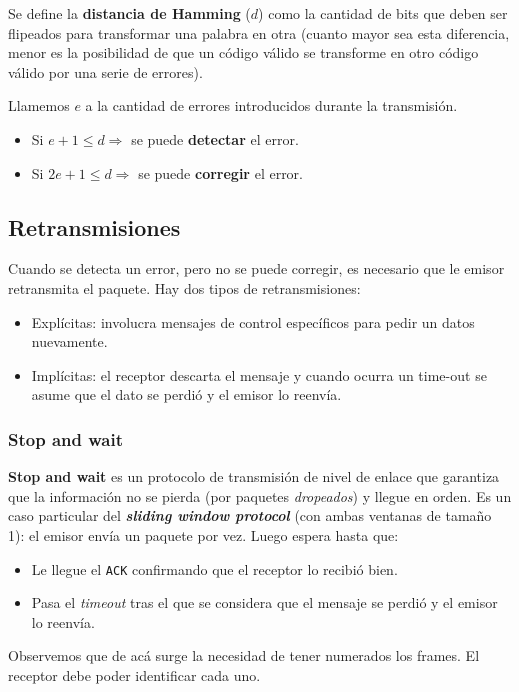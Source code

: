 \documentclass[]{article}
\begin{document}
Se define la \textbf{distancia de Hamming} ($d$) como la cantidad de bits que deben ser flipeados para transformar una palabra en otra (cuanto mayor sea esta diferencia, menor es la posibilidad de que un código válido se transforme en otro código válido por una serie de errores).

Llamemos $e$ a la cantidad de errores introducidos durante la transmisión.
\begin{itemize}
    \item Si $e + 1 \leq d \Rightarrow$ se puede \textbf{detectar} el error.
    \item Si $2e + 1 \leq d \Rightarrow$ se puede \textbf{corregir} el error.
\end{itemize}

\subsection{Retransmisiones}
Cuando se detecta un error, pero no se puede corregir, es necesario que le emisor retransmita el paquete. Hay dos tipos de retransmisiones:
\begin{itemize}
    \item Explícitas: involucra mensajes de control específicos para pedir un datos nuevamente.
    \item Implícitas: el receptor descarta el mensaje y cuando ocurra un time-out se asume que el dato se perdió y el emisor lo reenvía.
\end{itemize}

\subsubsection{Stop and wait}
\textbf{Stop and wait} es un protocolo de transmisión de nivel de enlace que garantiza que la información no se pierda (por paquetes \emph{dropeados}) y llegue en orden. Es un caso particular del \emph{\textbf{sliding window protocol}} (con ambas ventanas de tamaño 1): el emisor envía un paquete por vez. Luego espera hasta que:
\begin{itemize}
    \item Le llegue el \texttt{ACK} confirmando que el receptor lo recibió bien.
    \item Pasa el \emph{timeout} tras el que se considera que el mensaje se perdió y el emisor lo reenvía.
\end{itemize}

Observemos que de acá surge la necesidad de tener numerados los frames. El receptor debe poder identificar cada uno.
\end{document}
